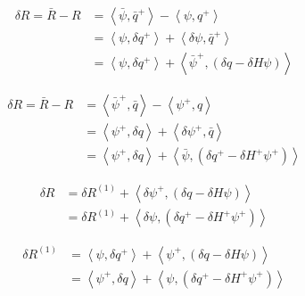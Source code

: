 \begin{equation*}\begin{split}
  \delta R = \bar{R} - R & = \left<\bar{\psi},\bar{q}^+\right> - \left<\psi,q^+\right> \\
                         & = \left<\psi,\delta q^+\right> + \left<\delta\psi,\bar{q}^+\right> \\
                         & = \left<\psi,\delta q^+\right> + \left<\bar{\psi}^+,\left(\delta q - \delta H\psi\right)\right>
\end{split}\end{equation*}

\begin{equation*}\begin{split}
  \delta R = \bar{R} - R & = \left<\bar{\psi}^+,\bar{q}\right> - \left<\psi^+,q\right> \\
                         & = \left<\psi^+,\delta q\right> + \left<\delta\psi^+,\bar{q}\right> \\
                         & = \left<\psi^+,\delta q\right> + \left<\bar{\psi},\left(\delta q^+ - \delta H^+\psi^+\right)\right>
\end{split}\end{equation*}

\begin{equation*}\begin{split}
  \delta R & = \delta R^{(1)} + \left<\delta\psi^+,\left(\delta q-\delta H\psi\right)\right> \\
           & = \delta R^{(1)} + \left<\delta\psi,\left(\delta q^+-\delta H^+\psi^+\right)\right>
\end{split}\end{equation*}

\begin{equation*}\begin{split}
  \delta R^{(1)} & = \left<\psi,\delta q^+\right> + \left<\psi^+,\left(\delta q - \delta H\psi\right)\right> \\
                 & = \left<\psi^+,\delta q\right> + \left<\psi,\left(\delta q^+ - \delta H^+\psi^+\right)\right>
\end{split}\end{equation*}
